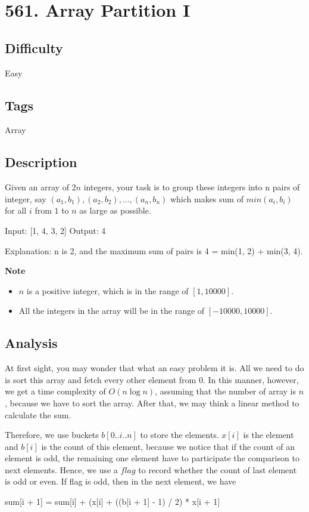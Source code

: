 \tocless\section{561. Array Partition I}
\label{algo:561}

\subsection*{Difficulty}
Easy

\subsection*{Tags}
Array

\subsection*{Description}
Given an array of $2n$ integers, your task is to group these integers into n pairs of integer, say $(a_1, b_1), (a_2, b_2), \dots, (a_n, b_n)$ which makes sum of $min(a_i, b_i)$ for all $i$ from $1$ to $n$ as large as possible.

\begin{example}
\begin{multilinecode}
Input: [1, 4, 3, 2]
Output: 4

Explanation: n is 2, and the maximum sum of pairs is 4 = min(1, 2) + min(3, 4).
\end{multilinecode}
\end{example}

\textbf{Note}
\begin{itemize}
    \item $n$ is a positive integer, which is in the range of $[1, 10000]$.
    \item All the integers in the array will be in the range of $[-10000, 10000]$.
\end{itemize}

\subsection*{Analysis}
At first sight, you may wonder that what an easy problem it is. All we need to do is sort this array and fetch every other element from 0. In this manner, however, we get a time complexity of $O(n{\log}n)$, assuming that the number of array is $n$, because we have to sort the array. After that, we may think a linear method to calculate the sum.

Therefore, we use buckets $b[0..i..n]$ to store the elements. $x[i]$ is the element and $b[i]$ is the count of this element, because we notice that if the count of an element is odd, the remaining one element have to participate the comparison to next elements. Hence, we use a $flag$ to record whether the count of last element is odd or even. If flag is odd, then in the next element, we have
\begin{multilinecode}
sum[i + 1] = sum[i] + (x[i] + ((b[i + 1] - 1) / 2) * x[i + 1]
\end{multilinecode}

